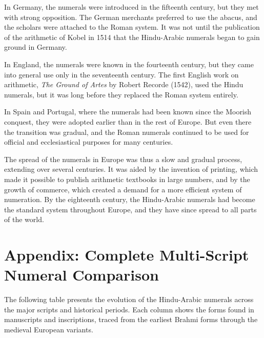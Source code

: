\documentclass[11pt,a4paper]{article}
\newenvironment{enhancednote}{%
  \begin{tcolorbox}[colback=enhancedbg,colframe=notecolor,boxrule=1pt,
    left=10pt,right=10pt,top=8pt,bottom=8pt,
    title={\textbf{Enhanced Edition Note}},fonttitle=\bfseries\color{notecolor}]
}{\end{tcolorbox}}
\begin{document}
In Germany, the numerals were introduced in the fifteenth century, but they met with strong opposition. The German merchants preferred to use the abacus, and the scholars were attached to the Roman system. It was not until the publication of the arithmetic of Kobel in 1514 that the Hindu-Arabic numerals began to gain ground in Germany.

In England, the numerals were known in the fourteenth century, but they came into general use only in the seventeenth century. The first English work on arithmetic, \textit{The Ground of Artes} by Robert Recorde (1542), used the Hindu numerals, but it was long before they replaced the Roman system entirely.

In Spain and Portugal, where the numerals had been known since the Moorish conquest, they were adopted earlier than in the rest of Europe. But even there the transition was gradual, and the Roman numerals continued to be used for official and ecclesiastical purposes for many centuries.

The spread of the numerals in Europe was thus a slow and gradual process, extending over several centuries. It was aided by the invention of printing, which made it possible to publish arithmetic textbooks in large numbers, and by the growth of commerce, which created a demand for a more efficient system of numeration. By the eighteenth century, the Hindu-Arabic numerals had become the standard system throughout Europe, and they have since spread to all parts of the world.

\newpage


\section*{Appendix: Complete Multi-Script Numeral Comparison}

\begin{enhancednote}
The following table presents the evolution of the Hindu-Arabic numerals across the major scripts and historical periods. Each column shows the forms found in manuscripts and inscriptions, traced from the earliest Brahmi forms through the medieval European variants.
\end{enhancednote}
\end{document}
